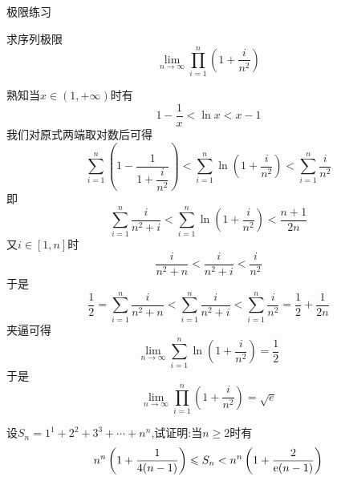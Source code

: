 \documentclass{ctexart}
\begin{document}
\pagestyle{empty}
\begin{center}\large
    极限练习
\end{center}
\begin{problem}[Problem 1.]
    求序列极限$$\lim_{n\to\infty}{\prod_{i=1}^{n}\left(1+\dfrac{i}{n^2}\right)}$$
\end{problem}
\begin{solution}[Solution.]
    熟知当$x\in(1,+\infty)$时有$$1-\dfrac{1}{x}<\ln x<x-1$$
    我们对原式两端取对数后可得
    $$\sum_{i=1}^{n}\left(1-\dfrac{1}{1+\dfrac{i}{n^2}}\right)<\sum_{i=1}^{n}\ln\left(1+\dfrac{i}{n^2}\right)<\sum_{i=1}^{n}\dfrac{i}{n^2}$$
    即$$\sum_{i=1}^{n}\dfrac{i}{n^2+i}<\sum_{i=1}^{n}\ln\left(1+\dfrac{i}{n^2}\right)<\dfrac{n+1}{2n}$$
    又$i\in[1,n]$时
    $$\dfrac{i}{n^2+n}<\dfrac{i}{n^2+i}<\dfrac{i}{n^2}$$
    于是$$\dfrac{1}{2}=\sum_{i=1}^{n}\dfrac{i}{n^2+n}<\sum_{i=1}^{n}\dfrac{i}{n^2+i}<\sum_{i=1}^{n}\dfrac{i}{n^2}=\dfrac{1}{2}+\dfrac{1}{2n}$$
    夹逼可得$$\lim_{n\to\infty}\sum_{i=1}^{n}\ln\left(1+\dfrac{i}{n^2}\right)=\dfrac{1}{2}$$
    于是$$\lim_{n\to\infty}{\prod_{i=1}^{n}\left(1+\dfrac{i}{n^2}\right)}=\sqrt{e}$$
\end{solution}
\begin{problem}[Problem 2.]
    设$S_n=1^1+2^2+3^3+\cdots+n^n$,试证明:当$n\geqslant2$时有
    $$n^n\left(1+\dfrac{1}{4(n-1)}\right)\leqslant S_n<n^n\left(1+\dfrac{2}{\mathrm{e}(n-1)}\right)$$
\end{problem}
\end{document}
